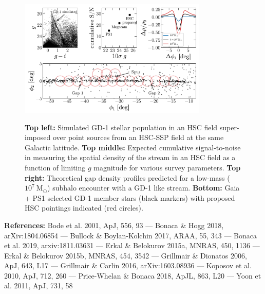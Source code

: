 \documentclass[11pt]{article}
\begin{document}
\begin{figure}[t]
\begin{center}
\includegraphics[width=0.8\textwidth]{figure1.pdf}
\caption{
\textbf{Top left:} Simulated GD-1 stellar population in an HSC field super-imposed over point sources from an HSC-SSP field at the same Galactic latitude.
\textbf{Top middle:} Expected cumulative signal-to-noise in measuring the spatial density of the stream in an HSC field as a function of limiting $g$ magnitude for various survey parameters.
\textbf{Top right:} Theoretical gap density profiles predicted for a low-mass ($10^7~\textrm{M}_\odot$) subhalo encounter with a GD-1 like stream.
\textbf{Bottom:} Gaia + PS1 selected GD-1 member stars (black markers) with proposed HSC pointings indicated (red circles).
}
\vspace{-1.5em}
\label{fig:}
\end{center}
\end{figure}

\textbf{References:}
Bode et al. 2001, ApJ, 556, 93 ---
Bonaca \& Hogg 2018, arXiv:1804.06854 ---
Bullock \& Boylan-Kolchin 2017, ARAA, 55, 343 ---
Bonaca et al. 2019, arxiv:1811.03631 ---
Erkal \& Belokurov 2015a, MNRAS, 450, 1136 ---
Erkal \& Belokurov 2015b, MNRAS, 454, 3542 ---
Grillmair \& Dionatos 2006, ApJ, 643, L17 ---
Grillmair \& Carlin 2016, arXiv:1603.08936 ---
Koposov et al. 2010, ApJ, 712, 260 ---
Price-Whelan \& Bonaca 2018, ApJL, 863, L20 ---
Yoon et al. 2011, ApJ, 731, 58
\end{document}

